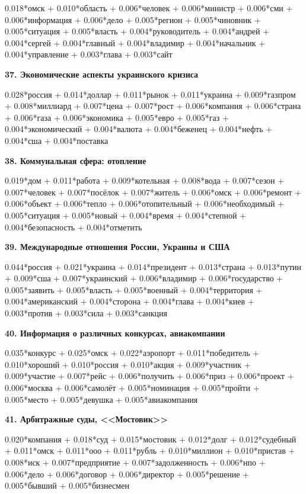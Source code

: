 0.018*омск + 0.010*область + 0.006*человек + 0.006*министр + 0.006*сми + 0.006*информация + 0.006*дело + 0.005*регион + 0.005*чиновник + 0.005*ситуация + 0.005*власть + 0.004*руководитель + 0.004*андрей + 0.004*сергей + 0.004*главный + 0.004*владимир + 0.004*начальник + 0.004*управление + 0.003*глава + 0.003*сайт

\textbf{37. Экономические аспекты украинского кризиса}

0.028*россия + 0.014*доллар + 0.011*рынок + 0.011*украина + 0.009*газпром + 0.008*миллиард + 0.007*цена + 0.007*рост + 0.006*компания + 0.006*страна + 0.006*газа + 0.006*экономика + 0.005*евро + 0.005*газ + 0.004*экономический + 0.004*валюта + 0.004*беженец + 0.004*нефть + 0.004*сша + 0.004*поставка

\textbf{38. Коммунальная сфера: отопление}

0.019*дом + 0.011*работа + 0.009*котельная + 0.008*вода + 0.007*сезон + 0.007*человек + 0.007*посёлок + 0.007*житель + 0.006*омск + 0.006*ремонт + 0.006*объект + 0.006*тепло + 0.006*отопительный + 0.006*необходимый + 0.005*ситуация + 0.005*новый + 0.004*время + 0.004*степной + 0.004*безопасность + 0.004*отметить

\textbf{39. Международные отношения России, Украины и США}

0.044*россия + 0.021*украина + 0.014*президент + 0.013*страна + 0.013*путин + 0.009*сша + 0.007*украинский + 0.006*владимир + 0.006*государство + 0.005*заявить + 0.005*власть + 0.005*военный + 0.004*территория + 0.004*американский + 0.004*сторона + 0.004*глава + 0.004*киев + 0.003*против + 0.003*сила + 0.003*санкция

\textbf{40. Информация о различных конкурсах, авиакомпании}

0.035*конкурс + 0.025*омск + 0.022*аэропорт + 0.011*победитель + 0.010*хороший + 0.010*россия + 0.010*акция + 0.009*участник + 0.009*участие + 0.007*рейс + 0.006*получить + 0.006*приз + 0.006*проект + 0.006*москва + 0.006*самолёт + 0.005*номинация + 0.005*пройти + 0.005*место + 0.005*девушка + 0.005*авиакомпания

\textbf{41. Арбитражные суды, <<Мостовик>>\footnotemark}

0.020*компания + 0.018*суд + 0.015*мостовик + 0.012*долг + 0.012*судебный + 0.011*омск + 0.011*ооо + 0.011*рубль + 0.010*миллион + 0.010*пристав + 0.008*иск + 0.007*предприятие + 0.007*задолженность + 0.006*нпо + 0.006*дело + 0.006*договор + 0.006*директор + 0.005*решение + 0.005*бывший + 0.005*бизнесмен

